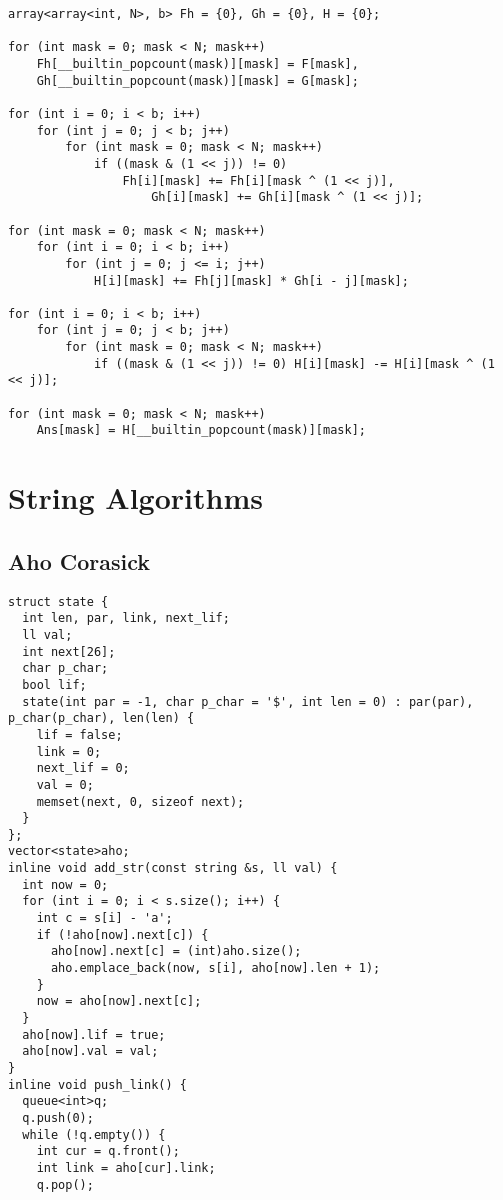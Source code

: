 \documentclass[10pt,a4paper,onesided]{article}
\begin{document}
\begin{multicols*}{3}
\begin{lstlisting}
array<array<int, N>, b> Fh = {0}, Gh = {0}, H = {0};

for (int mask = 0; mask < N; mask++)
    Fh[__builtin_popcount(mask)][mask] = F[mask],
    Gh[__builtin_popcount(mask)][mask] = G[mask];

for (int i = 0; i < b; i++)
    for (int j = 0; j < b; j++)
        for (int mask = 0; mask < N; mask++)
            if ((mask & (1 << j)) != 0)
                Fh[i][mask] += Fh[i][mask ^ (1 << j)],
                    Gh[i][mask] += Gh[i][mask ^ (1 << j)];

for (int mask = 0; mask < N; mask++)
    for (int i = 0; i < b; i++)
        for (int j = 0; j <= i; j++)
            H[i][mask] += Fh[j][mask] * Gh[i - j][mask];

for (int i = 0; i < b; i++)
    for (int j = 0; j < b; j++)
        for (int mask = 0; mask < N; mask++)
            if ((mask & (1 << j)) != 0) H[i][mask] -= H[i][mask ^ (1 << j)];

for (int mask = 0; mask < N; mask++)
    Ans[mask] = H[__builtin_popcount(mask)][mask];
\end{lstlisting}
\section{String Algorithms}
\subsection{Aho Corasick}
\begin{lstlisting}
struct state {
  int len, par, link, next_lif;
  ll val;
  int next[26];
  char p_char;
  bool lif;
  state(int par = -1, char p_char = '$', int len = 0) : par(par), p_char(p_char), len(len) {
    lif = false;
    link = 0;
    next_lif = 0;
    val = 0;
    memset(next, 0, sizeof next);
  }
};
vector<state>aho;
inline void add_str(const string &s, ll val) {
  int now = 0;
  for (int i = 0; i < s.size(); i++) {
    int c = s[i] - 'a';
    if (!aho[now].next[c]) {
      aho[now].next[c] = (int)aho.size();
      aho.emplace_back(now, s[i], aho[now].len + 1);
    }
    now = aho[now].next[c];
  }
  aho[now].lif = true;
  aho[now].val = val;
}
inline void push_link() {
  queue<int>q;
  q.push(0);
  while (!q.empty()) {
    int cur = q.front();
    int link = aho[cur].link;
    q.pop();


\end{lstlisting}
\end{multicols*}
\end{document}
